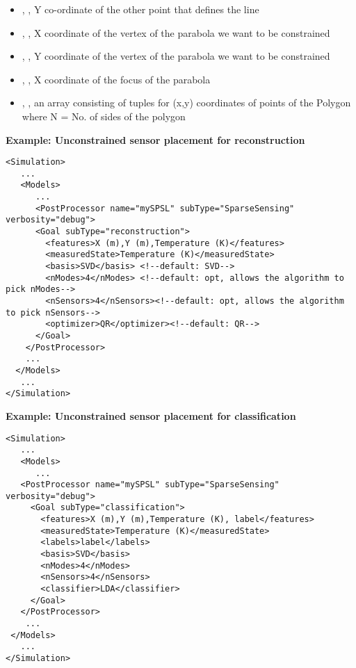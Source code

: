\begin{itemize}
\begin{itemize}
  \item {}, , Y co-ordinate of the other point that defines the line
  \item {}, , X coordinate of the vertex of the parabola we want to be constrained
  \item {}, , Y coordinate of the vertex of the parabola we want to be constrained
  \item {}, , X coordinate of the focus of the parabola
  \item {}, , an array consisting of tuples for (x,y) coordinates of points of the Polygon where N = No. of sides of the polygon
\end{itemize}
\end{itemize}

\textbf{Example: Unconstrained sensor placement for reconstruction}
\begin{lstlisting}[style=XML]
<Simulation>
   ...
   <Models>
      ...
      <PostProcessor name="mySPSL" subType="SparseSensing" verbosity="debug">
      <Goal subType="reconstruction">
        <features>X (m),Y (m),Temperature (K)</features>
        <measuredState>Temperature (K)</measuredState>
        <basis>SVD</basis> <!--default: SVD-->
        <nModes>4</nModes> <!--default: opt, allows the algorithm to pick nModes-->
        <nSensors>4</nSensors><!--default: opt, allows the algorithm to pick nSensors-->
        <optimizer>QR</optimizer><!--default: QR-->
      </Goal>
    </PostProcessor>
    ...
  </Models>
   ...
</Simulation>
\end{lstlisting}

\textbf{Example: Unconstrained sensor placement for classification}
\begin{lstlisting}[style=XML]
<Simulation>
   ...
   <Models>
      ...
   <PostProcessor name="mySPSL" subType="SparseSensing" verbosity="debug">
     <Goal subType="classification">
       <features>X (m),Y (m),Temperature (K), label</features>
       <measuredState>Temperature (K)</measuredState>
       <labels>label</labels>
       <basis>SVD</basis>
       <nModes>4</nModes>
       <nSensors>4</nSensors>
       <classifier>LDA</classifier>
     </Goal>
   </PostProcessor>
    ...
 </Models>
   ...
</Simulation>
\end{lstlisting}


